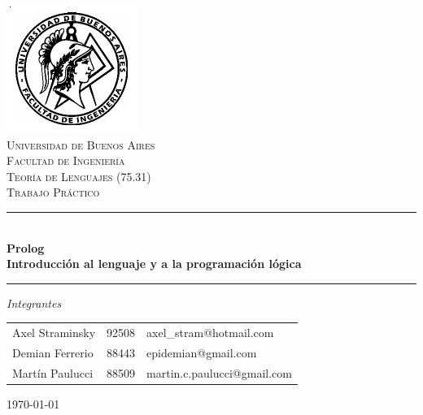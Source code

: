 \documentclass[12pt,titlepage]{article}
\begin{document}
\begin{titlepage}

\thispagestyle{empty}

\begin{center}
\includegraphics[scale=0.55]{./fiuba}\\
\textsc{\Large Universidad de Buenos Aires}\\[0.2cm]
\textsc{\Large Facultad de Ingeniería}\\[1.5cm]


\textsc{\large Teoría de Lenguajes (75.31)} \\[0.3cm]
\textsc{\large Trabajo Práctico} \\[0.5cm]

\rule{\linewidth}{0.5mm} \\[0.4cm]
{\huge \bfseries Prolog} \\[0.3cm]
{\Large \bfseries Introducción al lenguaje y a la programación lógica}
\rule{\linewidth}{0.5mm} 

\vfill

\begin{flushleft}
\Large\emph{Integrantes} \\[0.2cm]


\begin{tabular}{lll}
Axel Straminsky & 92508 & axel\_stram@hotmail.com \\
Demian Ferrerio & 88443 & epidemian@gmail.com \\
Martín Paulucci & 88509 & martin.c.paulucci@gmail.com \\
\end{tabular}
\end{flushleft}

{\Large \today}

\end{center}
\end{titlepage}

\end{document}
